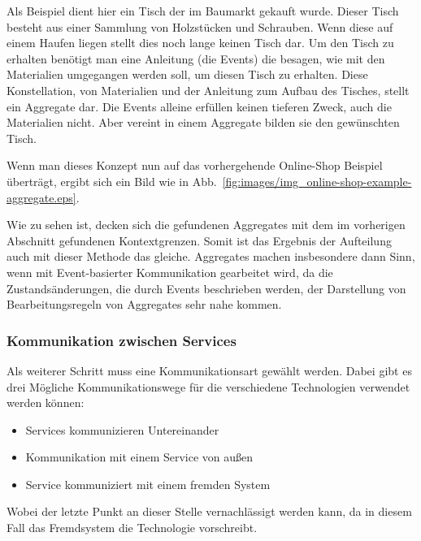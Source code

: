 \documentclass[12pt,a4paper,bibliography=totocnumbered,listof=totocnumbered]{scrartcl}
\begin{document}
Als Beispiel dient hier ein Tisch der im Baumarkt gekauft wurde. Dieser Tisch besteht aus einer Sammlung von Holzstücken und Schrauben. Wenn diese auf einem Haufen liegen stellt dies noch lange keinen Tisch dar. Um den Tisch zu erhalten benötigt man eine Anleitung (die Events) die besagen, wie mit den Materialien umgegangen werden soll, um diesen Tisch zu erhalten. Diese Konstellation, von Materialien und der Anleitung zum Aufbau des Tisches, stellt ein Aggregate dar. Die Events alleine erfüllen keinen tieferen Zweck, auch die Materialien nicht. Aber vereint in einem Aggregate bilden sie den gewünschten Tisch.\cite{mogosanu}

Wenn man dieses Konzept nun auf das vorhergehende Online-Shop Beispiel überträgt, ergibt sich ein Bild wie in Abb.~\ref{fig:images/img_online-shop-example-aggregate.eps}.


Wie zu sehen ist, decken sich die gefundenen Aggregates mit dem im vorherigen Abschnitt gefundenen Kontextgrenzen. Somit ist das Ergebnis der Aufteilung auch mit dieser Methode das gleiche. Aggregates machen insbesondere dann Sinn, wenn mit Event-basierter Kommunikation gearbeitet wird, da die Zustandsänderungen, die durch Events beschrieben werden, der Darstellung von Bearbeitungsregeln von Aggregates sehr nahe kommen.

\subsubsection{Kommunikation zwischen Services}

Als weiterer Schritt muss eine Kommunikationsart gewählt werden. Dabei gibt es drei Mögliche Kommunikationswege für die verschiedene Technologien verwendet werden können:

\begin{itemize}
	\item Services kommunizieren Untereinander
	\item Kommunikation mit einem Service von außen
	\item Service kommuniziert mit einem fremden System
\end{itemize}

Wobei der letzte Punkt an dieser Stelle vernachlässigt werden kann, da in diesem Fall das Fremdsystem die Technologie vorschreibt.
\end{document}
